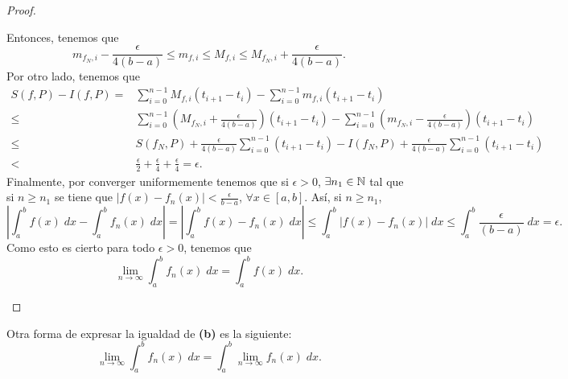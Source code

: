 \begin{proof}
\begin{description}
	Entonces, tenemos que 
	\[m_{f_{N},i} - \frac{\epsilon }{4\left(b-a\right)} \leq m_{f,i} \leq M_{f,i} \leq M_{f_{N}, i} + \frac{\epsilon }{4\left(b-a\right)} .\]
Por otro lado, tenemos que 
\[
\begin{split}
	S\left(f,P\right)-I\left(f,P\right) = & \sum^{n-1}_{ i=0}M_{f,i}\left(t_{i+1}-t_{i}\right)-\sum^{n-1}_{i=0}m_{f,i}\left(t_{i+1}-t_{i}\right) \\
	\leq & \sum^{n-1}_{i=0}\left( M_{f_{N},i} + \frac{\epsilon }{4\left(b-a\right)}\right)\left(t_{i+1}-t_{i}\right) - \sum^{n-1}_{i=0}\left(m_{f_{N},i}-\frac{\epsilon }{4\left(b-a\right)} \right)\left(t_{i+1}-t_{i}\right) \\
	\leq & S\left(f_{N},P\right) + \frac{\epsilon }{4\left(b-a\right)}\sum^{n-1}_{i=0}\left(t_{i+1}-t_{i}\right) - I\left(f_{N}, P\right) + \frac{\epsilon }{4\left(b-a\right)}\sum^{n-1}_{i = 0 }\left(t_{i+1}-t_{i}\right) \\
	< & \frac{\epsilon }{2} + \frac{\epsilon }{4} + \frac{\epsilon }{4} = \epsilon .
\end{split}
\]
Finalmente, por converger uniformemente tenemos que si $\displaystyle \epsilon > 0 $, $\displaystyle \exists n_{1} \in \mathbb{N} $ tal que si $\displaystyle n \geq n_{1} $ se tiene que $\displaystyle \left|f\left(x\right)-f_{n}\left(x\right)\right|<\frac{\epsilon }{b-a} $, $\displaystyle \forall x \in \left[a,b\right]  $. Así, si $\displaystyle n \geq n_{1} $,
\[ \left|\int^{b}_{a} f\left(x\right) \; dx -\int^{b}_{a} f_{n}\left(x\right) \; dx\right| = \left|\int^{b}_{a} f\left(x\right)-f_{n}\left(x\right) \; dx\right| \leq \int^{b}_{a} \left|f\left(x\right)-f_{n}\left(x\right)\right| \; dx \leq \int^{b}_{a} \frac{\epsilon }{\left(b-a\right)} \; dx = \epsilon  .\]
Como esto es cierto para todo $\displaystyle \epsilon > 0 $, tenemos que 
\[ \lim_{n \to \infty}\int^{b}_{a} f_{n}\left(x\right) \; dx = \int^{b}_{a} f\left(x\right) \; dx .\]
\end{description}
\end{proof}
\begin{observation}
\normalfont Otra forma de expresar la igualdad de \textbf{(b)} es la siguiente:
\[\lim_{n \to \infty}\int^{b}_{a} f_{n}\left(x\right) \; dx = \int^{b}_{a} \lim_{n \to \infty}f_{n}\left(x\right) \; dx .\]
\end{observation}

